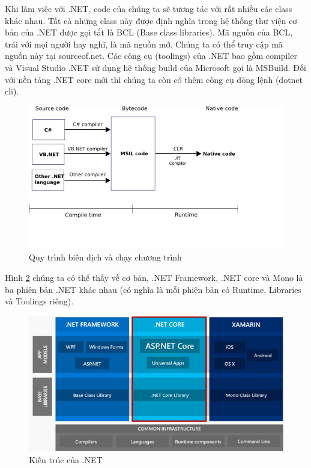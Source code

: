 \par
Khi làm việc với .NET, code của chúng ta sẽ tương tác với rất nhiều các class khác nhau. Tất cả những class này được định nghĩa trong hệ thống thư viện cơ bản của .NET được gọi tắt là BCL (Base class libraries). Mã nguồn của BCL, trái với mọi người hay nghĩ, là mã nguồn mở. Chúng ta có thể truy cập mã nguồn này tại sourceof.net. Các công cụ (toolings) của .NET bao gồm compiler và Visual Studio .NET sử dụng hệ thống build của Microsoft gọi là MSBuild. Đối với nền tảng .NET core mới thì chúng ta còn có thêm công cụ dòng lệnh (dotnet cli).
\begin{center}
    \begin{figure}[h]
    \begin{center}
     \includegraphics[scale=0.6]{image/chayDotNet.png}
    \end{center}
    \caption{Quy trình biên dịch và chạy chương trình}
    \label{refhinh2_2}
    \end{figure}
\end{center}
\par
Hình \ref{refhinh2_3} chúng ta có thể thấy về cơ bản, .NET Framework, .NET core và Mono là ba phiên bản .NET khác nhau (có nghĩa là mỗi phiên bản có Runtime, Libraries và Toolings riêng).
\begin{center}
    \begin{figure}[h]
    \begin{center}
     \includegraphics[scale=0.9]{image/kienTrucDotNetCore.png}
    \end{center}
    \caption{Kiến trúc của .NET }
    \label{refhinh2_3}
    \end{figure}
\end{center}
